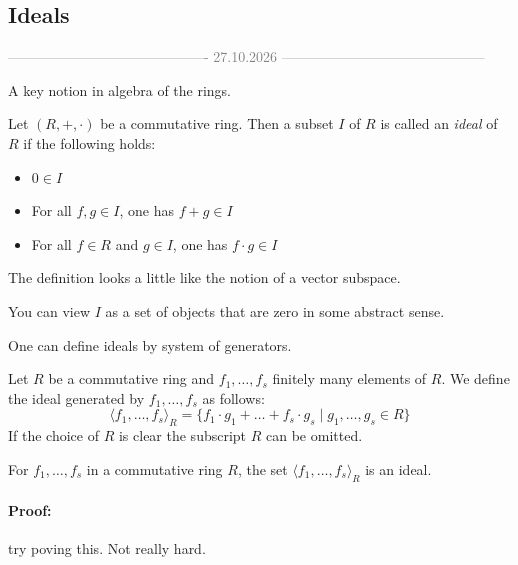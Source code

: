 \clearpage
\subsection{Ideals}
\begin{center}
  \textcolor{gray}{------------------------------------------- 27.10.2026 --------------------------------------------} \\[0.3em]
\end{center}  

A key notion in algebra of the rings. 

\begin{definition}[title = Definition 1.4.1]
    Let $(R, +, \cdot)$ be a commutative ring. Then a subset $I$ of $R$ is called an \textit{ideal} of $R$ if the following holds: 
    \begin{itemize}
      \item[(a)] $0 \in I$ 
      \item[(b)] For all $f, g \in I$, one has $f + g \in I$ 
      \item[(c)] For all $f \in R$ and $g \in I$, one has $f \cdot g \in I$   
    \end{itemize}
\end{definition}

The definition looks a little like the notion of a vector subspace. 

You can view $I$ as a set of objects that are zero in some abstract sense. 

One can define ideals by system of generators. 

\begin{definition}[title = Definition 1.4.2]
    Let $R$ be a commutative ring and $f_1, \ldots, f_s$ finitely many elements of $R$. We define the ideal generated by $f_1, \ldots, f_s$ as follows: 
    \[\langle f_1, \ldots, f_s \rangle_{R} = \{f_1 \cdot g_1 + \ldots + f_s \cdot g_s \mid g_1, \ldots, g_s \in R\}\]  
    If the choice of $R$ is clear the subscript $R$ can be omitted.
\end{definition}

\begin{lemma}[title = Lemma 1.4.3]
    For $f_1, \ldots, f_s$ in a commutative ring $R$, the set $\langle f_1, \ldots, f_s \rangle_{R}$ is an ideal. 

    \paragraph{Proof:} 
    try poving this. Not really hard. 

\end{lemma}

